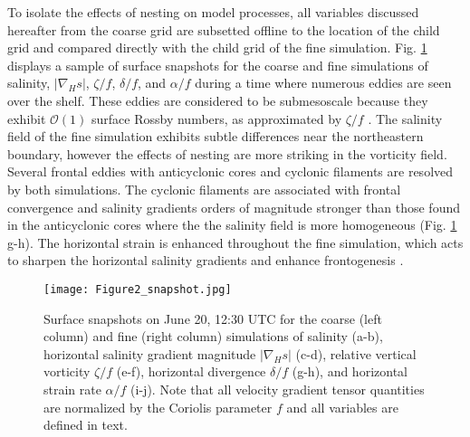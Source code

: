 \documentclass[draft]{agujournal2019}
\begin{document}
To isolate the effects of nesting on model processes, all variables discussed hereafter from the coarse grid are subsetted offline to the location of the child grid and compared directly with the child grid of the fine simulation. Fig. \ref{fig:surface_snapshots} displays a sample of surface snapshots for the coarse and fine simulations of salinity, $|\nabla_H s|$, $\zeta/f$, $\delta/f$, and $\alpha/f$ during a time where numerous eddies are seen over the shelf. These eddies are considered to be submesoscale because they exhibit $\mathcal{O}(1)$ surface Rossby numbers, as approximated by $\zeta/f$ \cite{Barkan_2017, Kobashi_2020, McWilliams_2016}.  The salinity field of the fine simulation exhibits subtle differences near the northeastern boundary, however the effects of nesting are more striking in the vorticity field. Several frontal eddies with anticyclonic cores and cyclonic filaments are resolved by both simulations. The cyclonic filaments are associated with frontal convergence \cite{Kobashi_2020} and salinity gradients orders of magnitude stronger than those found in the anticyclonic cores where the the salinity field is more homogeneous (Fig. \ref{fig:surface_snapshots}  g-h). The horizontal strain is enhanced throughout the fine simulation, which acts to sharpen the horizontal salinity gradients and enhance frontogenesis \cite{Hoskins_1972}.

\begin{figure} 
 \centerline{\texttt{[image: Figure2\_snapshot.jpg]}}
  \caption{Surface snapshots on June 20, 12:30 UTC for the coarse (left column) and fine (right column) simulations of salinity (a-b), horizontal salinity gradient magnitude $|\nabla_H s|$ (c-d), relative vertical vorticity $\zeta/f$ (e-f), horizontal divergence $\delta/f$ (g-h), and horizontal strain rate $\alpha/f$ (i-j). Note that all velocity gradient tensor quantities are normalized by the Coriolis parameter $f$ and all variables are defined in text.}
  \label{fig:surface_snapshots}
\end{figure} 
\end{document}
